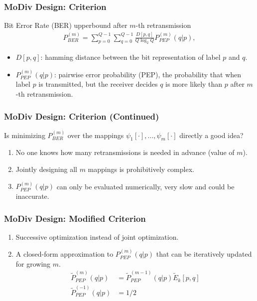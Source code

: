 \documentclass{beamer}
\begin{document}
\begin{frame}
  \frametitle{MoDiv Design: Criterion}
  \begin{block}{Bit Error Rate (BER) upperbound after $m$-th retransmission}
    \begin{align*}
      P_{BER}^{(m)} = \sum_{p=0}^{Q - 1}\sum_{q=0}^{Q - 1}\frac{D[p,
      q]}{Q\log_2Q}P_{PEP}^{(m)}(q|p), \label{eq:P_BER}
    \end{align*}
  \end{block}
  \begin{itemize}
    \item $D[p,q]$: hamming distance between the bit representation of label $p$
    and $q$.
    \item $P_{PEP}^{(m)}(q|p)$: pairwise error probability (PEP), the
    probability that when label $p$ is transmitted, but the receiver decides $q$
    is more likely than $p$ after $m$-th retransmission.
  \end{itemize}
\end{frame}

\begin{frame}
  \frametitle{MoDiv Design: Criterion (Continued)}
  Is minimizing $P_{BER}^{(m)}$ over the mappings $\psi_1[\cdot],\ldots,
  \psi_m[\cdot]$ directly a good idea?
  \begin{enumerate}
    \item No one knows how many retransmissions is needed in advance (value
    of $m$).
    \item Jointly designing all $m$ mappings is prohibitively complex.
    \item $P_{PEP}^{(m)}(q|p)$ can only be evaluated numerically, very slow and
    could be inaccurate.
  \end{enumerate}
\end{frame}

\begin{frame}
  \frametitle{MoDiv Design: Modified Criterion}
  \begin{enumerate}
    \item<1-> Successive optimization instead of joint optimization.
    \item<3> A closed-form approximation to $P_{PEP}^{(m)}(q|p)$ that can be
    iteratively updated for growing $m$.
    \begin{align*}
      \tilde{P}_{PEP}^{(m)}(q|p) &= \tilde{P}_{PEP}^{(m -
      1)}(q|p)\tilde{E}_k[p,q] \\
      \tilde{P}_{PEP}^{(-1)}(q|p) &= 1 / 2
    \end{align*}
  \end{enumerate}
\end{frame}
\end{document}
